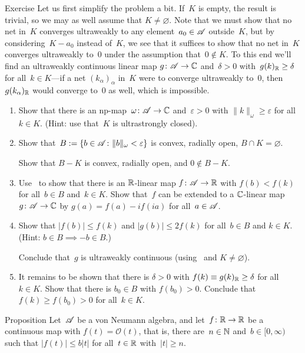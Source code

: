 \documentclass[a]{subfiles}
\begin{document}
\begin{parsec}
\begin{point}[ultraclosed]{Exercise}
Let us first simplify the problem a bit.
If~$K$ is empty, the result is trivial,
so we may as well assume that $K\neq \varnothing$.
Note that we must show that no net in~$K$ converges ultraweakly
to any element~$a_0\in\mathscr{A}$ outside~$K$,
but by considering~$K-a_0$ instead of~$K$,
we see that it suffices to show that
no net in~$K$ converges ultraweakly to~$0$
under the assumption that~$0\notin K$.
To this end we'll find an ultraweakly continuous linear map
$g\colon \mathscr{A}\to \mathbb{C}$ and~$\delta>0$ 
with~$g(k)_{\mathbb{R}}\geq \delta$ for all~$k\in K$---if
a net $(k_\alpha)_\alpha$ in~$K$ were to converge ultraweakly to~$0$,
then~$g(k_\alpha)_{\mathbb{R}}$ would converge to~$0$ as well,
which is impossible.
\begin{enumerate}
\item
	Show that 
	there is an np-map~$\omega \colon\mathscr{A}\to\mathbb{C}$
	and~$\varepsilon>0$ 
	with $\|k\|_\omega \geq \varepsilon$ for all~$k\in K$.
	(Hint: use that~$K$ is ultrastrongly closed).
\item
	Show that~$B:= \{ b\in \mathscr{A}\colon \|b\|_\omega < \varepsilon\}$
	 is convex, radially open, $B\cap K=\varnothing$.

	Show that $B-K$ is convex, radially open, and $0\notin B-K$.
\item
	Use~ to show that
	 there is an $\mathbb{R}$-linear map $f\colon \mathscr{A}\to \mathbb{R}$
	with $f(b)<f(k)$ for all~$b\in B$ and~$k\in K$.
	Show that~$f$
	can be extended to a $\mathbb{C}$-linear map
	$g \colon \mathscr{A}\to \mathbb{C}$
	by $g(a)= f(a)-if(ia)$ for all~$a\in\mathscr{A}$.
\item
	Show that $\left| f(b)\right| \leq f(k)$ 
	and $\left|g(b)\right|\leq 2f(k)$
	for all~$b\in B$ and $k\in K$.\\
	(Hint: $b\in B\implies -b\in B$.)

	Conclude that~$g$ is ultraweakly continuous
	(using~ and $K\neq \varnothing$).
\item
	It remains to be shown that
	there is $\delta>0$ with $f(k)\equiv g(k)_{\mathbb{R}}\geq \delta$
	for all~$k\in K$.
	Show that there is $b_0\in B$
	with $f(b_0) >0$.
	Conclude that $f(k)\geq f(b_0)>0 $ for all~$k\in K$.
\end{enumerate}
\end{point}
\begin{point}{Proposition}%
Let~$\mathscr{A}$ be a von Neumann algebra,
and let~$f\colon \mathbb{R}\to\mathbb{R}$ be a continuous map 
with $f(t)=\mathcal{O}(t)$,
that is,
there are~$n\in \mathbb{N}$ and~$b\in [0,\infty)$
such that $\left|f(t)\right|\leq b\left|t\right|$
for all~$t\in \mathbb{R}$ with~$\left|t\right| \geq n$.


\end{point}
\end{parsec}
\end{document}
